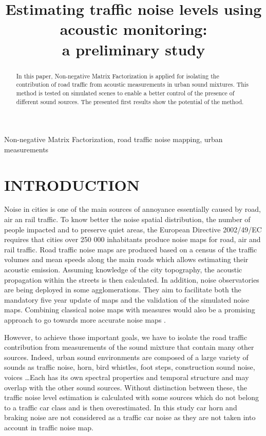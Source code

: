 \documentclass{article}
\title{Estimating traffic noise levels using acoustic monitoring: \\ a preliminary study}
\begin{document}
\maketitle

\begin{sloppy}

\begin{abstract}
In this paper, Non-negative Matrix Factorization is applied for isolating the contribution of road traffic from acoustic measurements in urban sound mixtures. This method is tested on simulated scenes to enable a better control of the presence of different sound sources. The presented first results show the potential of the method.
\end{abstract}

\begin{keywords}
Non-negative Matrix Factorization, road traffic noise mapping, urban measurements
\end{keywords}

\section{INTRODUCTION}
\label{sec:motivations}

Noise in cities is one of the main sources of annoyance essentially caused by road, air an rail traffic. To know better the noise spatial distribution, the number of people impacted and to preserve quiet areas, the European Directive 2002/49/EC \cite{directive} requires that cities over 250 000 inhabitants produce noise maps for road, air and rail traffic. Road traffic noise maps are produced based on a census of the traffic volumes and mean speeds along the main roads which allows estimating their acoustic emission. Assuming knowledge of the city topography, the acoustic propagation within the streets is then calculated. In addition, noise observatories are being deployed in some agglomerations. They aim to facilitate both the mandatory five year update of maps and the validation of the simulated noise maps. Combining classical noise maps with measures would also be a promising approach to go towards more accurate noise maps \cite{Can} \cite{deCoensel}.


However, to achieve those important goals, we have to isolate the road traffic contribution from measurements  of the sound mixture that contain many other sources. Indeed, urban sound environments are composed of a large variety of sounds as traffic noise, horn, bird whistles, foot steps, construction sound noise, voices \dots Each has its own spectral properties and temporal structure and may overlap with the other sound sources. Without distinction between these, the traffic noise level estimation is calculated with some sources which do not belong to a traffic car class and is then overestimated. In this study car horn and braking noise are not considered as a traffic car noise as they are not taken into account in traffic noise map.\\


\end{sloppy}
\end{document}
